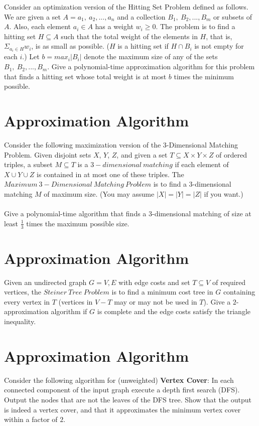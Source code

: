 \documentclass[a4paper,11pt]{article}
\begin{document}
Consider an optimization version of the Hitting Set Problem defined as follows. We are given a set $A={a_1,\ a_2,...,a_n}$ and a collection $B_1,\ B_2,...,B_m$ or subsets of $A$. Also, each element $a_i\in A$ has a weight $w_i\geqslant 0$. The problem is to find a hitting set $H\subseteq A$ such that the total weight of the elements in $H$, that is, $\Sigma _{a_i\in H} w_i$, is as small as possible. ($H$ is a hitting set if $H\cap B_i$ is not empty for each $i$.) Let $b=max_i|B_i|$ denote the maximum size of any of the sets $B_1,\ B_2,...,B_m$. Give a polynomial-time approximation algorithm for this problem that finds a hitting set whose total weight is at most $b$ times the minimum possible.

\section{Approximation Algorithm}

Consider the following maximization version of the 3-Dimensional Matching Problem. Given disjoint sets $X$, $Y$, $Z$, and given a set $T\subseteq X\times Y\times Z$ of ordered triples, a subset $M\subseteq T$ is a $3-dimensional\ matching$ if each element of $X\cup Y\cup Z$ is contained in at most one of these triples. The $Maximum\ 3-Dimensional\ Matching\ Problem$ is to find a 3-dimensional matching $M$ of maximum size. (You may assume $|X|=|Y|=|Z|$ if you want.)\\\\
Give a polynomial-time algorithm that finds a 3-dimensional matching of size at least $ \frac{1}{3} $ times the maximum possible size.

\section{Approximation Algorithm}

Given an undirected graph $G={V,E}$ with edge costs and set $T\subseteq V$ of required vertices, the $Steiner\ Tree\ Problem$ is to find a minimum cost tree in $G$ containing every vertex in $T$ (vertices in $V-T$ may or may not be used in $T$). Give a $2$-approximation algorithm if $G$ is complete and the edge costs satisfy the triangle inequality.

\section{Approximation Algorithm}

Consider the following algorithm for (unweighted) {\bf Vertex Cover}: In each connected component of the input graph execute a depth first search (DFS). Output the nodes that are not the leaves of the DFS tree. Show that the output is indeed a vertex cover, and that it approximates the minimum vertex cover within a factor of $2$.
\end{document}
